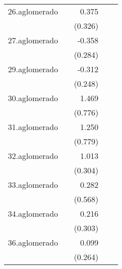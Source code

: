 {\begin{longtable}{l*{4}{D{.}{.}{-1}}}
\addlinespace
26.aglomerado&                     &       0.375         &                     &                     \\
            &                     &     (0.326)         &                     &                     \\
\addlinespace
27.aglomerado&                     &      -0.358         &                     &                     \\
            &                     &     (0.284)         &                     &                     \\
\addlinespace
29.aglomerado&                     &      -0.312         &                     &                     \\
            &                     &     (0.248)         &                     &                     \\
\addlinespace
30.aglomerado&                     &       1.469         &                     &                     \\
            &                     &     (0.776)         &                     &                     \\
\addlinespace
31.aglomerado&                     &       1.250         &                     &                     \\
            &                     &     (0.779)         &                     &                     \\
\addlinespace
32.aglomerado&                     &       1.013\sym{***}&                     &                     \\
            &                     &     (0.304)         &                     &                     \\
\addlinespace
33.aglomerado&                     &       0.282         &                     &                     \\
            &                     &     (0.568)         &                     &                     \\
\addlinespace
34.aglomerado&                     &       0.216         &                     &                     \\
            &                     &     (0.303)         &                     &                     \\
\addlinespace
36.aglomerado&                     &       0.099         &                     &                     \\
            &                     &     (0.264)         &                     &                     \\

\end{longtable}}
